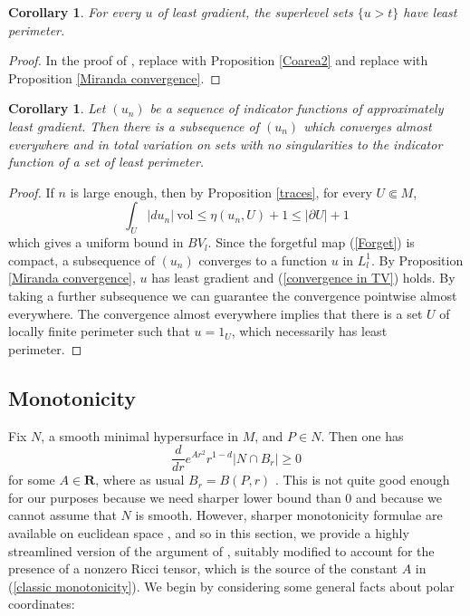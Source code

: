 \documentclass[reqno,12pt,letterpaper]{amsart}
\newcommand{\RR}{\mathbf{R}}
\newcommand{\vol}{\mathrm{vol}}
\newtheorem{corollary}[theorem]{Corollary}
\theoremstyle{definition}
\numberwithin{equation}{section}
\begin{document}
\begin{corollary}\label{level sets are minimal}
For every $u$ of least gradient, the superlevel sets $\{u > t\}$ have least perimeter.
\end{corollary}
\begin{proof}
In the proof of \cite[Theorem 1]{BOMBIERI1969}, replace \cite[Theorem 1.6]{Miranda66} with Proposition \ref{Coarea2} and replace \cite[Theorem 3]{Miranda67} with Proposition \ref{Miranda convergence}.
\end{proof}

\begin{corollary}\label{compactness}
Let $(u_n)$ be a sequence of indicator functions of approximately least gradient.
Then there is a subsequence of $(u_n)$ which converges almost everywhere and in total variation on sets with no singularities to the indicator function of a set of least perimeter.
\end{corollary}
\begin{proof}
If $n$ is large enough, then by Proposition \ref{traces}, for every $U \Subset M$,
$$\int_U |du_n| ~\vol \leq \eta(u_n, U) + 1 \leq |\partial U| + 1$$
which gives a uniform bound in $BV_l$.
Since the forgetful map (\ref{Forget}) is compact, a subsequence of $(u_n)$ converges to a function $u$ in $L^1_l$.
By Proposition \ref{Miranda convergence}, $u$ has least gradient and (\ref{convergence in TV}) holds.
By taking a further subsequence we can guarantee the convergence pointwise almost everywhere.
The convergence almost everywhere implies that there is a set $U$ of locally finite perimeter such that $u = 1_U$, which necessarily has least perimeter.
\end{proof}


\subsection{Monotonicity}\label{inequalities}
Fix $N$, a smooth minimal hypersurface in $M$, and $P \in N$. Then one has
\begin{equation}\label{classic monotonicity}
\frac{d}{dr} e^{Ar^2}r^{1 - d} |N \cap B_r| \geq 0
\end{equation}
for some $A \in \RR$, where as usual $B_r = B(P, r)$ \cite[\S7]{MarquesXX}.
This is not quite good enough for our purposes because we need sharper lower bound than $0$ and because we cannot assume that $N$ is smooth.
However, sharper monotonicity formulae are available on euclidean space \cite[Proposition 5.12]{Giusti77}, and so in this section, we provide a highly streamlined version of the argument of \cite[Chapter 5]{Giusti77}, suitably modified to account for the presence of a nonzero Ricci tensor, which is the source of the constant $A$ in (\ref{classic monotonicity}).
We begin by considering some general facts about polar coordinates:
\end{document}
